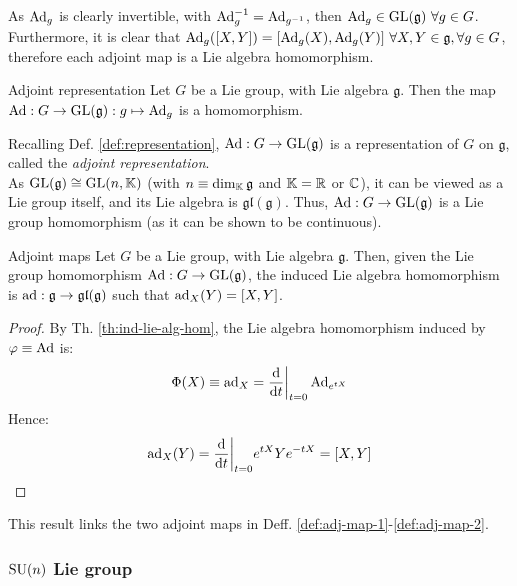 As $ \operatorname{Ad}_g $ is clearly invertible, with $ \operatorname{Ad}_g^{-1} = \operatorname{Ad}_{g^{-1}} $, then $ \operatorname{Ad}_g \in \mathrm{GL}(\mathfrak{g}) \,\,\forall g \in G $. Furthermore, it is clear that $ \operatorname{Ad}_g([X,Y]) = [\operatorname{Ad}_g(X),\operatorname{Ad}_g(Y)] \,\,\forall X,Y \in \mathfrak{g} , \forall g \in G $, therefore each adjoint map is a Lie algebra homomorphism.

\begin{proposition}{Adjoint representation}{}
  Let $ G $ be a Lie group, with Lie algebra $ \mathfrak{g} $. Then the map $ \operatorname{Ad} : G \rightarrow \mathrm{GL}(\mathfrak{g}) : g \mapsto \operatorname{Ad}_g $ is a homomorphism.
\end{proposition}

Recalling Def. \ref{def:representation}, $ \operatorname{Ad} : G \rightarrow \mathrm{GL}(\mathfrak{g}) $ is a representation of $ G $ on $ \mathfrak{g} $, called the \textit{adjoint representation}.\\
As $ \mathrm{GL}(\mathfrak{g}) \cong \mathrm{GL}(n,\mathbb{K}) $ (with $ n \equiv \dim_{\mathbb{K}} \mathfrak{g} $ and $ \mathbb{K} = \mathbb{R} $ or $ \mathbb{C} $), it can be viewed as a Lie group itself, and its Lie algebra is $ \mathfrak{gl}(\mathfrak{g}) $. Thus, $ \operatorname{Ad} : G \rightarrow \mathrm{GL}(\mathfrak{g}) $ is a Lie group homomorphism (as it can be shown to be continuous).

\begin{proposition}{Adjoint maps}{}
  Let $ G $ be a Lie group, with Lie algebra $ \mathfrak{g} $. Then, given the Lie group homomorphism $ \operatorname{Ad} : G \rightarrow \mathrm{GL}(\mathfrak{g}) $, the induced Lie algebra homomorphism is $ \operatorname{ad} : \mathfrak{g} \rightarrow \mathfrak{gl}(\mathfrak{g}) $ such that $ \operatorname{ad}_X(Y) = [X,Y] $.

  \tcblower

  \begin{proof}
    By Th. \ref{th:ind-lie-alg-hom}, the Lie algebra homomorphism induced by $ \varphi \equiv \operatorname{Ad} $ is:
    \begin{equation*}
      \Phi(X) \equiv \operatorname{ad}_X = \frac{\mathrm{d}}{\mathrm{d} t}\bigg\vert_{t = 0} \operatorname{Ad}_{e^{tX}}
    \end{equation*}
    Hence:
    \begin{equation*}
      \operatorname{ad}_X(Y) = \frac{\mathrm{d}}{\mathrm{d} t}\bigg\vert_{t = 0} e^{tX} Y e^{-tX} = [X,Y]
    \end{equation*}
  \end{proof}
\end{proposition}

This result links the two adjoint maps in Deff. \ref{def:adj-map-1}-\ref{def:adj-map-2}.

\subsubsection{$ \mathrm{SU}(n) $ Lie group}

